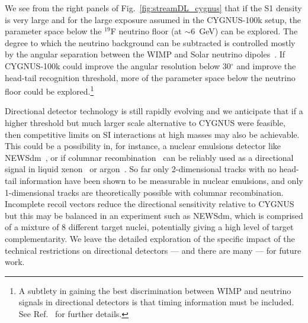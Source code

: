 \documentclass[prd,10pt,twocolumn,showpacs,nofootinbib,aps,superscriptaddress,preprintnumbers]{revtex4-1}
\begin{document}
We see from the right panels of Fig.~\ref{fig:streamDL_cygnus}
that if the S1 density is very large and for the large exposure assumed in the CYGNUS-100k setup, 
the parameter space below the $^{19}$F neutrino floor (at $\sim 6$~GeV) can be explored.
The degree to which the neutrino background can be subtracted is controlled mostly 
by the angular separation between the WIMP and Solar neutrino dipoles~\cite{O'Hare:2015mda,OHare:2017rag}. 
If CYGNUS-100k could improve the angular resolution below 30$^\circ$ and improve
the head-tail recognition threshold, more of the parameter space below the neutrino floor
could be explored.\footnote{A subtlety in gaining the best discrimination between WIMP 
and neutrino signals in directional detectors is that timing information must be included.
See Ref.~\cite{O'Hare:2015mda} for further details.
}


Directional detector technology is still rapidly evolving and 
we anticipate that if a higher threshold but much larger scale alternative to CYGNUS were feasible,
then competitive limits on SI interactions at high masses may also be achievable.
This could be a possibility in, for instance, a nuclear emulsions detector like NEWSdm~\cite{Aleksandrov:2016fyr,Agafonova:2017ajg},
or if columnar recombination~\cite{Nygren:2013nda,Li:2015zga} can be reliably used as a directional signal 
in liquid xenon~\cite{Nakajima:2015dva,Nakajima:2015cva,Oliveira:2015una,Mohlabeng:2015efa,Nakamura:2018xvy} 
or argon~\cite{Cao:2014gns,Cadeddu:2016mac,Cadeddu:2017ebu}.
So far only 2-dimensional tracks with no head-tail information have been shown to be measurable in nuclear emulsions, 
and only 1-dimensional tracks are theoretically possible with columnar recombination.
Incomplete recoil vectors reduce the directional sensitivity relative to CYGNUS
but this may be balanced in an experiment such as NEWSdm, which is comprised of a mixture of 8 different target nuclei,
potentially giving a high level of target complementarity.
We leave the detailed exploration of the specific impact of the technical restrictions 
on directional detectors --- and there are many --- for future work.
\end{document}
